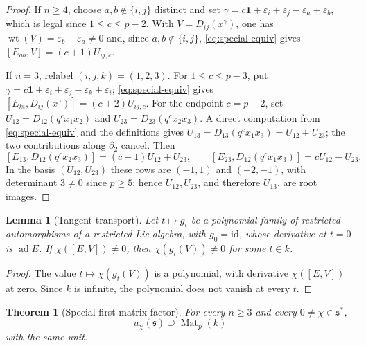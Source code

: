 \documentclass[11pt,reqno]{amsart}
\newtheorem{theorem}{Theorem}[section]
\newtheorem{lemma}[lemma]{Lemma}
\theoremstyle{definition}
\theoremstyle{remark}
\theoremstyle{definition}
\newcommand{\Mat}{\operatorname{Mat}}
\begin{document}
\begin{proof}
If $n\ge4$, choose $a,b\notin\{i,j\}$ distinct and set
$\gamma=c\mathbf1+\varepsilon_i+\varepsilon_j-\varepsilon_a+\varepsilon_b$,
which is legal since $1\le c\le p-2$.  With $V=D_{ij}(x^\gamma)$, one has
$\operatorname{wt}(V)=\varepsilon_b-\varepsilon_a\ne0$ and, since
$a,b\notin\{i,j\}$, \eqref{eq:special-equiv} gives
$[E_{ab},V]=(c+1)U_{ij,c}$.

If $n=3$, relabel $(i,j,k)=(1,2,3)$.  For $1\le c\le p-3$, put
$\gamma=c\mathbf1+\varepsilon_i+\varepsilon_j-\varepsilon_k+\varepsilon_i$;
\eqref{eq:special-equiv} gives
$[E_{ki},D_{ij}(x^\gamma)]=(c+2)U_{ij,c}$.  For the endpoint $c=p-2$, set
$U_{12}=D_{12}(q^cx_1x_2)$ and $U_{23}=D_{23}(q^cx_2x_3)$.  A direct
computation from \eqref{eq:special-equiv} and the definitions gives
$U_{13}=D_{13}(q^cx_1x_3)=U_{12}+U_{23}$; the two contributions along
$\partial_2$ cancel. Then
\[
 [E_{13},D_{12}(q^cx_2x_3)]=(c+1)U_{12}+U_{23},\qquad
 [E_{23},D_{12}(q^cx_1x_3)]=cU_{12}-U_{23}.
\]
In the basis $(U_{12},U_{23})$ these rows are $(-1,1)$ and $(-2,-1)$, with
determinant $3\ne0$ since $p\ge5$; hence $U_{12},U_{23}$, and therefore
$U_{13}$, are root images.
\end{proof}

\begin{lemma}[Tangent transport]\label{lem:tangent-transport}
Let $t\mapsto g_t$ be a polynomial family of restricted automorphisms of
a restricted Lie algebra, with $g_0=\mathrm{id}$, whose derivative at
$t=0$ is $\operatorname{ad}E$.  If $\chi([E,V])\ne0$, then
$\chi(g_t(V))\ne0$ for some $t\in k$.
\end{lemma}

\begin{proof}
The value $t\mapsto\chi(g_t(V))$ is a polynomial, with derivative
$\chi([E,V])$ at zero.  Since $k$ is infinite, the polynomial does not
vanish at every $t$.
\end{proof}

\begin{theorem}[Special first matrix factor]\label{thm:special-first-matrix}
For every $n\ge3$ and every $0\ne\chi\in\mathfrak s^*$,
\[
 u_\chi(\mathfrak s)\supseteq\Mat_p(k)
\]
with the same unit.
\end{theorem}
\end{document}
